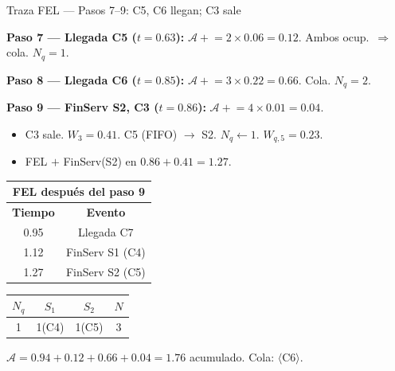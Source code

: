 \documentclass[aspectratio=1610, 9pt]{beamer}
\begin{document}
\begin{frame}{Traza FEL --- Pasos 7--9: C5, C6 llegan; C3 sale}

\small
\textbf{Paso 7 --- Llegada C5 ($t = 0.63$):} $\mathcal{A} \mathrel{+}= 2\times0.06 = 0.12$. Ambos ocup.\ $\Rightarrow$ cola. $N_q = 1$.

\textbf{Paso 8 --- Llegada C6 ($t = 0.85$):} $\mathcal{A} \mathrel{+}= 3\times0.22 = 0.66$. Cola. $N_q = 2$.

\textbf{Paso 9 --- FinServ S2, C3 ($t = 0.86$):} $\mathcal{A} \mathrel{+}= 4\times0.01 = 0.04$.
\begin{itemize}
    \item C3 sale. $W_3 = 0.41$. C5 (FIFO) $\to$ S2. $N_q \leftarrow 1$. $W_{q,5} = 0.23$.
    \item \textcolor{verdeoscuro}{FEL $+$} FinServ(S2) en $0.86 + 0.41 = 1.27$.
\end{itemize}

\vspace{0.15cm}
\begin{center}
\renewcommand{\arraystretch}{1.3}
\begin{tabular}{|c|c|}
\hline
\multicolumn{2}{|c|}{\cellcolor{azuloscuro!15}\textbf{FEL después del paso 9}} \\
\hline
\textbf{Tiempo} & \textbf{Evento} \\
\hline
\rowcolor{yellow!20} 0.95 & Llegada C7 \\
1.12 & FinServ S1 (C4) \\
1.27 & FinServ S2 (C5) \\
\hline
\end{tabular}
\hspace{1cm}
\begin{tabular}{|c|c|c|c|}
\hline
$N_q$ & $S_1$ & $S_2$ & $N$ \\
\hline
1 & 1(C4) & 1(C5) & 3 \\
\hline
\end{tabular}
\end{center}

\vspace{0.1cm}
$\mathcal{A} = 0.94 + 0.12 + 0.66 + 0.04 = 1.76$ acumulado. Cola: $\langle$C6$\rangle$.
\end{frame}
\end{document}
